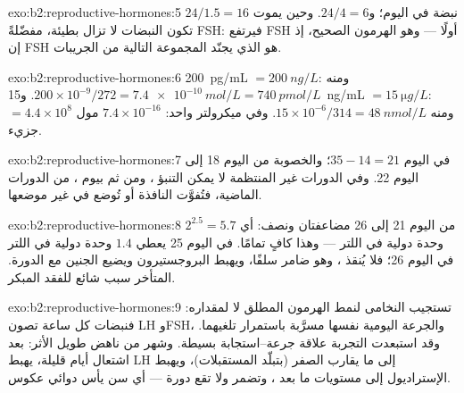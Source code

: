 \begin{solution}{exo:b2:reproductive-hormones:5}
$24/1.5 = 16$ نبضة في اليوم؛ و$24/4 = 6$. وحين يموت 
تكون النبضات لا تزال بطيئة، مفضّلةً FSH: فيرتفع FSH أولًا --- وهو
الهرمون الصحيح، إذ إن FSH هو الذي يجنّد المجموعة التالية من
الجريبات.
\end{solution}

\begin{solution}{exo:b2:reproductive-hormones:6}
\qty{200}{pg/mL} $= \qty{200}{ng/L}$: ومنه $200\times 10^{-9}/272 =
\qty{7.4e-10}{mol/L} = \qty{740}{pmol/L}$. و\qty{15}{ng/mL} $=
\qty{15}{\micro g/L}$: ومنه $15\times 10^{-6}/314 = \qty{48}{nmol/L}$. وفي
ميكرولتر واحد: $7.4\times 10^{-16}$ مول $= 4.4\times 10^{8}$
جزيء.
\end{solution}

\begin{solution}{exo:b2:reproductive-hormones:7}
 في اليوم $35 - 14 = 21$؛ والخصوبة من اليوم 18 إلى اليوم 22. وفي
الدورات غير المنتظمة لا يمكن التنبؤ ، ومن ثم بيوم
، من الدورات الماضية، فتُفوَّت النافذة أو
تُوضع في غير موضعها.
\end{solution}

\begin{solution}{exo:b2:reproductive-hormones:8}
من اليوم 21 إلى 26 مضاعفتان ونصف: أي $2^{2.5} = 5.7$ وحدة دولية في اللتر --- وهذا كافٍ تمامًا.
 في اليوم 25 يعطي $1.4$ وحدة دولية في اللتر في اليوم 26؛ فلا يُنقذ ، وهو ضامر سلفًا، ويهبط البروجستيرون ويضيع
الجنين مع الدورة.  المتأخر سبب شائع
للفقد المبكر.
\end{solution}

\begin{solution}{exo:b2:reproductive-hormones:9}
تستجيب النخامى لنمط الهرمون المطلق لا لمقداره:
فنبضات كل ساعة تصون LH وFSH، والجرعة اليومية نفسها مسرَّبة
باستمرار تلغيهما. وقد استبعدت التجربة علاقة جرعة--استجابة بسيطة.
وشهر من ناهض طويل الأثر: بعد اشتعال أيام قليلة، يهبط LH إلى
ما يقارب الصفر (بتبلّد المستقبلات)، ويهبط الإستراديول إلى
مستويات ما بعد ، وتضمر  ولا تقع دورة --- أي
سن يأس دوائي عكوس.
\end{solution}

